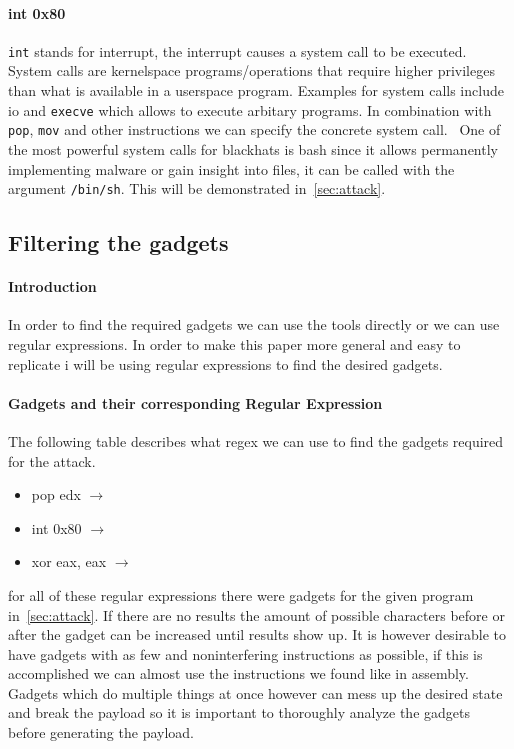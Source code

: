 \documentclass[journal=tosc,submission, notanonymous]{iacrtrans}
\begin{document}
\paragraph{int 0x80}
\Verb+int+ stands for interrupt, the interrupt  causes a system call to be executed. System calls are kernelspace programs/operations that require higher privileges than what is available in a userspace program. Examples for system calls include io and \Verb+execve+ which allows to execute arbitary programs. In combination with \Verb+pop+, \Verb+mov+ and other instructions we can specify the concrete system call.~\cite{ropsla} One of the most powerful system calls for blackhats is bash since it allows permanently implementing malware or gain insight into files, it can be called with the argument \Verb+/bin/sh+. This will be demonstrated in~\cref{sec:attack}.
\subsection{Filtering the gadgets}
\label{subsec:filtering}
\paragraph{Introduction}
In order to find the required gadgets we can use the tools directly or we can use regular expressions. In order to make this paper more general and easy to replicate i will be using regular expressions to find the desired gadgets.
\paragraph{Gadgets and their corresponding Regular Expression}
The following table describes what regex we can use to find the gadgets required for the attack.
\begin{itemize}
\item pop edx  $\rightarrow$ 
\item int 0x80  $\rightarrow$  
\item xor eax, eax  $\rightarrow$  
\end{itemize}
for all of these regular expressions there were gadgets for the given program in~\cref{sec:attack}. If there are no results the amount of possible characters before or after the gadget can be increased until results show up. It is however desirable to have gadgets with as few and noninterfering instructions as possible, if this is accomplished we can almost use the instructions we found like in assembly. Gadgets which do multiple things at once however can mess up the desired state and break the payload so it is important to thoroughly analyze the gadgets before generating the payload.
\end{document}
